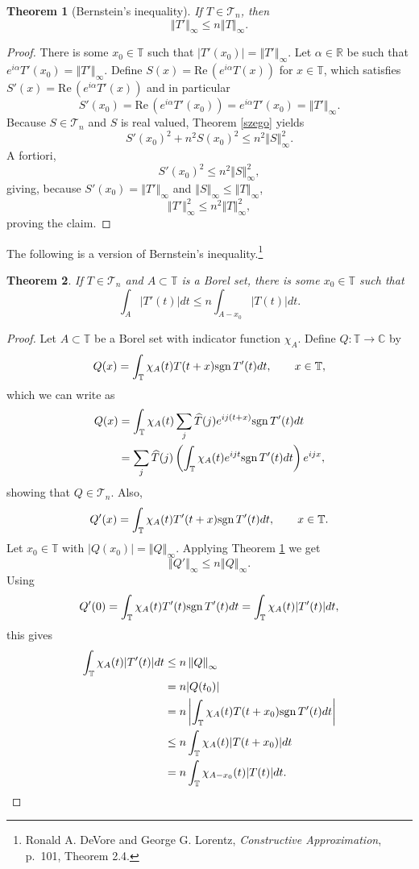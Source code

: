\documentclass{article}
\def\Re{\ensuremath{\mathrm{Re}}\,}
\newcommand{\sgn}{\ensuremath\mathrm{sgn}\,}
\newcommand{\norm}[1]{\left\Vert #1 \right\Vert}
\newtheorem{theorem}{Theorem}
\theoremstyle{definition}
\begin{document}
\begin{theorem}[Bernstein's inequality]
If $T \in \mathscr{T}_n$, then
\[
\norm{T'}_\infty \leq n \norm{T}_\infty.
\]
\label{bernstein}
\end{theorem}
\begin{proof}
There is some $x_0 \in \mathbb{T}$ such that $|T'(x_0)| = \norm{T'}_\infty$. 
Let $\alpha \in \mathbb{R}$ be such that
$e^{i\alpha} T'(x_0) = \norm{T'}_\infty$. 
Define $S(x)=\Re(e^{i\alpha} T(x))$ for $x \in \mathbb{T}$, which
satisfies $S'(x)=\Re(e^{i\alpha} T'(x))$ and in particular
\[
S'(x_0)=\Re(e^{i\alpha} T'(x_0))=
e^{i\alpha} T'(x_0)=\norm{T'}_\infty.
\]
Because $S \in \mathscr{T}_n$ and $S$ is real valued,  
Theorem \ref{szego} yields
\[
S'(x_0)^2+n^2 S(x_0)^2 \leq n^2 \norm{S}_\infty^2.
\]
A fortiori,
\[
S'(x_0)^2 \leq n^2 \norm{S}_\infty^2,
\]
giving, because $S'(x_0)=\norm{T'}_\infty$ and
$\norm{S}_\infty \leq \norm{T}_\infty$,
\[
\norm{T'}_\infty^2 \leq n^2  \norm{T}_\infty^2,
\]
proving the claim.
\end{proof}



The following is a version of Bernstein's inequality.\footnote{Ronald A. DeVore and George G. Lorentz,
{\em Constructive Approximation}, p.~101, Theorem 2.4.} 

\begin{theorem}
If $T \in \mathscr{T}_n$
and $A \subset \mathbb{T}$ is a Borel set, there is some $x_0 \in \mathbb{T}$ such that
\[
\int_A |T'(t)| dt \leq n \int_{A-x_0} |T(t)| dt.
\]
\end{theorem}
\begin{proof}
Let $A \subset \mathbb{T}$ be a Borel set with indicator function $\chi_A$.
Define
$Q:\mathbb{T} \to \mathbb{C}$ by
\[
Q(x) = \int_{\mathbb{T}} \chi_A(t) T(t+x) \sgn T'(t) dt, \qquad x \in
\mathbb{T},
\]
which we can write as
\begin{align*}
Q(x)&=\int_{\mathbb{T}} \chi_A(t) \sum_j \widehat{T}(j) e^{ij(t+x)} \sgn T'(t) dt\\
&=\sum_j \widehat{T}(j) \left( \int_{\mathbb{T}} \chi_A(t) e^{ijt} \sgn T'(t) dt \right)   e^{ijx},
\end{align*}
showing that $Q \in \mathscr{T}_n$.  Also,
\[
Q'(x) = \int_{\mathbb{T}} \chi_A(t) T'(t+x) \sgn T'(t) dt, \qquad x \in \mathbb{T}.
\]
 Let
$x_0 \in \mathbb{T}$ with $|Q(x_0)| = \norm{Q}_\infty$. Applying
Theorem \ref{bernstein} we get
\[
\norm{Q'}_\infty \leq n \norm{Q}_\infty.
\]
Using
\[
Q'(0) = \int_{\mathbb{T}} \chi_A(t) T'(t) \sgn T'(t) dt
=\int_{\mathbb{T}} \chi_A(t) |T'(t)| dt,
\]
this gives
\begin{align*}
\int_{\mathbb{T}} \chi_A(t) |T'(t)| dt&\leq n \norm{Q}_\infty\\
&=n|Q(t_0)|\\
&=n\left| \int_{\mathbb{T}} \chi_A(t) T(t+x_0) \sgn T'(t) dt \right|\\
&\leq n \int_{\mathbb{T}} \chi_A(t) |T(t+x_0)| dt\\
&=n \int_{\mathbb{T}} \chi_{A-x_0}(t) |T(t)| dt.
\end{align*}
\end{proof}
\end{document}
